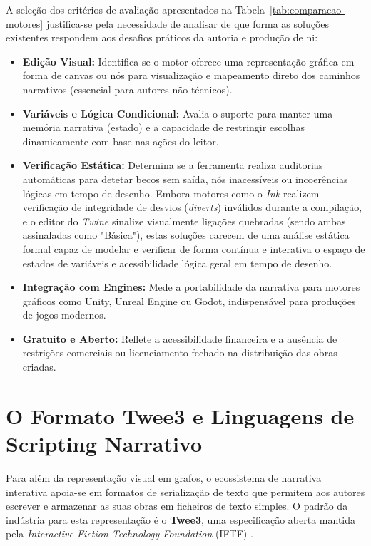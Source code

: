 A seleção dos critérios de avaliação apresentados na Tabela~\ref{tab:comparacao-motores} justifica-se pela necessidade de analisar de que forma as soluções existentes respondem aos desafios práticos da autoria e produção de \gls{ni}:
\begin{itemize}
    \item \textbf{Edição Visual:} Identifica se o motor oferece uma representação gráfica em forma de canvas ou nós para visualização e mapeamento direto dos caminhos narrativos (essencial para autores não-técnicos).
    \item \textbf{Variáveis e Lógica Condicional:} Avalia o suporte para manter uma memória narrativa (estado) e a capacidade de restringir escolhas dinamicamente com base nas ações do leitor.
    \item \textbf{Verificação Estática:} Determina se a ferramenta realiza auditorias automáticas para detetar becos sem saída, nós inacessíveis ou incoerências lógicas em tempo de desenho. Embora motores como o \textit{Ink} realizem verificação de integridade de desvios (\textit{diverts}) inválidos durante a compilação, e o editor do \textit{Twine} sinalize visualmente ligações quebradas (sendo ambas assinaladas como "Básica"), estas soluções carecem de uma análise estática formal capaz de modelar e verificar de forma contínua e interativa o espaço de estados de variáveis e acessibilidade lógica geral em tempo de desenho.
    \item \textbf{Integração com Engines:} Mede a portabilidade da narrativa para motores gráficos como Unity, Unreal Engine ou Godot, indispensável para produções de jogos modernos.
    \item \textbf{Gratuito e Aberto:} Reflete a acessibilidade financeira e a ausência de restrições comerciais ou licenciamento fechado na distribuição das obras criadas.
\end{itemize}
\section{O Formato Twee3 e Linguagens de Scripting Narrativo}
\label{sec:formato-twee3}
Para além da representação visual em grafos, o ecossistema de narrativa interativa apoia-se em formatos de serialização de texto que permitem aos autores escrever e armazenar as suas obras em ficheiros de texto simples. O padrão da indústria para esta representação é o \textbf{Twee3}, uma especificação aberta mantida pela \textit{Interactive Fiction Technology Foundation} (IFTF) \citep{IFTFGDC2026}.

